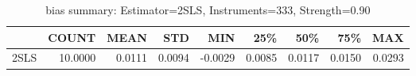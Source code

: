 \begin{table}[ht]
\centering
\caption{bias summary: Estimator=2SLS, Instruments=333, Strength=0.90}
\begin{tabular}{lrrrrrrrr}
\toprule
 & COUNT & MEAN & STD & MIN & 25\% & 50\% & 75\% & MAX \\
\midrule
2SLS & 10.0000 & 0.0111 & 0.0094 & -0.0029 & 0.0085 & 0.0117 & 0.0150 & 0.0293 \\
\bottomrule
\end{tabular}
\end{table}
